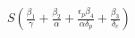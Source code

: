 \documentclass[preview]{standalone}
\begin{document}
\begin{center}
$S ( \frac{\beta_1}{\gamma} + \frac{\beta_2}{\alpha} + \frac{\epsilon_p \beta_4}{\alpha \delta_p} + \frac{\beta_3}{\delta_c} )$
\end{center}
\end{document}
